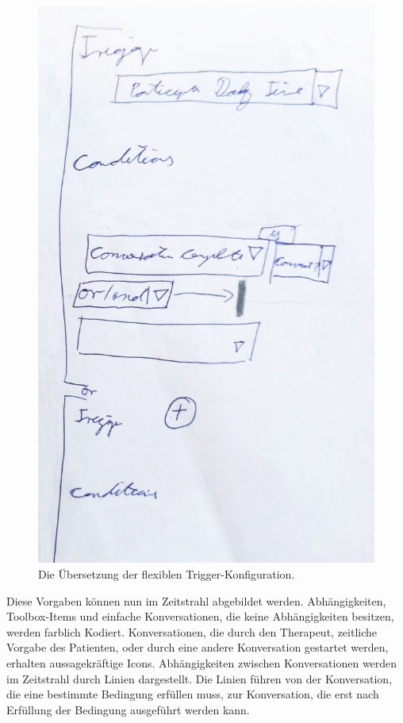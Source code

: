 \begin{figure}
\begin{minipage}[b]{.325\linewidth}
      \includegraphics[width=\linewidth]{pictures/triggerset}
      \caption{Die Übersetzung der flexiblen Trigger-Konfiguration.}
      \label{triggerset}
   \end{minipage}
\end{figure}

Diese Vorgaben können nun im Zeitstrahl abgebildet werden. Abhängigkeiten, Toolbox-Items und einfache Konversationen, die keine Abhängigkeiten besitzen, werden farblich Kodiert. Konversationen, die durch den Therapeut, zeitliche Vorgabe des Patienten, oder durch eine andere Konversation gestartet werden, erhalten aussagekräftige Icons. Abhängigkeiten zwischen Konversationen werden im Zeitstrahl durch Linien dargestellt. Die Linien führen von der Konversation, die eine bestimmte Bedingung erfüllen muss, zur Konversation, die erst nach Erfüllung der Bedingung ausgeführt werden kann. 

